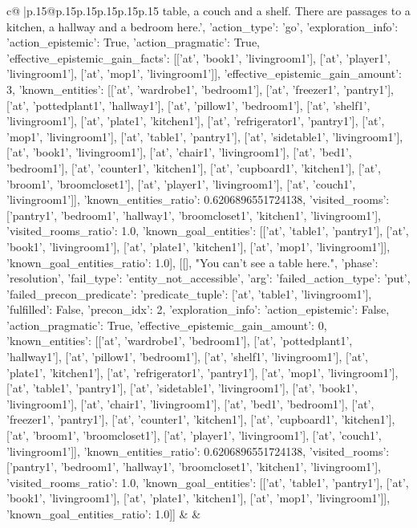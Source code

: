 \documentclass{article}
\begin{document}
{\begin{supertabular}{c@{$\;$}|p{.15\linewidth}@{}p{.15\linewidth}p{.15\linewidth}p{.15\linewidth}p{.15\linewidth}p{.15\linewidth}}
{{{table, a couch and a shelf. There are passages to a kitchen, a hallway and a bedroom here.', {'action_type': 'go', 'exploration_info': {'action_epistemic': True, 'action_pragmatic': True, 'effective_epistemic_gain_facts': [['at', 'book1', 'livingroom1'], ['at', 'player1', 'livingroom1'], ['at', 'mop1', 'livingroom1']], 'effective_epistemic_gain_amount': 3, 'known_entities': [['at', 'wardrobe1', 'bedroom1'], ['at', 'freezer1', 'pantry1'], ['at', 'pottedplant1', 'hallway1'], ['at', 'pillow1', 'bedroom1'], ['at', 'shelf1', 'livingroom1'], ['at', 'plate1', 'kitchen1'], ['at', 'refrigerator1', 'pantry1'], ['at', 'mop1', 'livingroom1'], ['at', 'table1', 'pantry1'], ['at', 'sidetable1', 'livingroom1'], ['at', 'book1', 'livingroom1'], ['at', 'chair1', 'livingroom1'], ['at', 'bed1', 'bedroom1'], ['at', 'counter1', 'kitchen1'], ['at', 'cupboard1', 'kitchen1'], ['at', 'broom1', 'broomcloset1'], ['at', 'player1', 'livingroom1'], ['at', 'couch1', 'livingroom1']], 'known_entities_ratio': 0.6206896551724138, 'visited_rooms': ['pantry1', 'bedroom1', 'hallway1', 'broomcloset1', 'kitchen1', 'livingroom1'], 'visited_rooms_ratio': 1.0, 'known_goal_entities': [['at', 'table1', 'pantry1'], ['at', 'book1', 'livingroom1'], ['at', 'plate1', 'kitchen1'], ['at', 'mop1', 'livingroom1']], 'known_goal_entities_ratio': 1.0}}], [[], "You can't see a table here.", {'phase': 'resolution', 'fail_type': 'entity_not_accessible', 'arg': {'failed_action_type': 'put', 'failed_precon_predicate': {'predicate_tuple': ['at', 'table1', 'livingroom1'], 'fulfilled': False, 'precon_idx': 2}}, 'exploration_info': {'action_epistemic': False, 'action_pragmatic': True, 'effective_epistemic_gain_amount': 0, 'known_entities': [['at', 'wardrobe1', 'bedroom1'], ['at', 'pottedplant1', 'hallway1'], ['at', 'pillow1', 'bedroom1'], ['at', 'shelf1', 'livingroom1'], ['at', 'plate1', 'kitchen1'], ['at', 'refrigerator1', 'pantry1'], ['at', 'mop1', 'livingroom1'], ['at', 'table1', 'pantry1'], ['at', 'sidetable1', 'livingroom1'], ['at', 'book1', 'livingroom1'], ['at', 'chair1', 'livingroom1'], ['at', 'bed1', 'bedroom1'], ['at', 'freezer1', 'pantry1'], ['at', 'counter1', 'kitchen1'], ['at', 'cupboard1', 'kitchen1'], ['at', 'broom1', 'broomcloset1'], ['at', 'player1', 'livingroom1'], ['at', 'couch1', 'livingroom1']], 'known_entities_ratio': 0.6206896551724138, 'visited_rooms': ['pantry1', 'bedroom1', 'hallway1', 'broomcloset1', 'kitchen1', 'livingroom1'], 'visited_rooms_ratio': 1.0, 'known_goal_entities': [['at', 'table1', 'pantry1'], ['at', 'book1', 'livingroom1'], ['at', 'plate1', 'kitchen1'], ['at', 'mop1', 'livingroom1']], 'known_goal_entities_ratio': 1.0}}]] 
	  } 
	   } 
	   } 
	 & & \\ 
 


\end{supertabular}}
\end{document}
